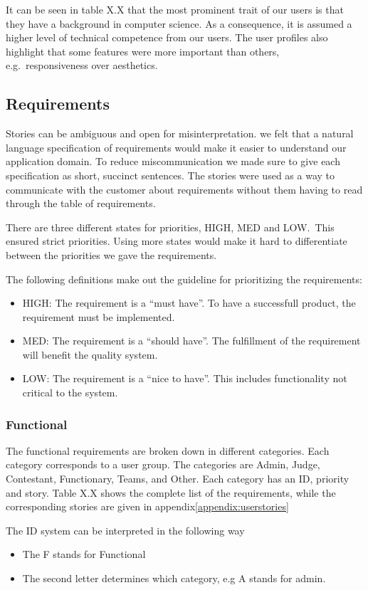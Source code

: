 It can be seen in table X.X that the most prominent trait of our users is that
they have a background in computer science. As a consequence, it is assumed a
higher level of technical competence from our users. The user profiles also
highlight that some features were more important than others, e.g.\
responsiveness over aesthetics.

\subsection{Requirements}
Stories can be ambiguous and open for misinterpretation.
we felt that a natural language specification of requirements would make it
easier to understand our application domain. To reduce miscommunication we made
sure to give each specification as short, succinct sentences. The stories were
used as a way to communicate with the customer about requirements without them
having to read through the table of requirements.

There are three different states for priorities, HIGH, MED and LOW.\
This ensured strict priorities.
Using more states would make it hard to differentiate between the priorities we
gave the requirements.

The following definitions make out the guideline for
prioritizing the requirements:
\begin{itemize}
    \item HIGH: The requirement is a ``must have''. To have a successfull product,
        the requirement must be implemented.
    \item MED: The requirement is a ``should have''. The fulfillment of the
        requirement will benefit the quality system.
    \item LOW: The requirement is a ``nice to have''. This includes functionality
        not critical to the system.
\end{itemize}

\subsubsection{Functional}
The functional requirements are broken down in different categories.
Each category corresponds to a user group. The categories are Admin, Judge,
Contestant, Functionary, Teams, and Other. Each category has an ID, priority
and story. Table X.X shows the complete list of the requirements, while the
corresponding stories are given in appendix\ref{appendix:userstories}

The ID system can be interpreted in the following way
\begin{itemize}
    \item The F stands for Functional
    \item The second letter determines which category, e.g A stands for admin.
\end{itemize}

